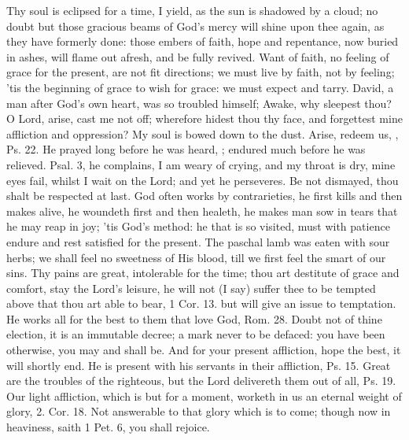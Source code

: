 {Thy soul is eclipsed for a time, I yield, as the sun is shadowed by a
cloud; no doubt but those gracious beams of God's mercy will shine upon
thee again, as they have formerly done: those embers of faith, hope and
repentance, now buried in ashes, will flame out afresh, and be fully
revived. Want of faith, no feeling of grace for the present, are not
fit directions; we must live by faith, not by feeling; 'tis the
beginning of grace to wish for grace: we must expect and tarry. David,
a man after God's own heart, was so troubled himself; Awake, why
sleepest thou? O Lord, arise, cast me not off; wherefore hidest thou
thy face, and forgettest mine affliction and oppression? My soul is
bowed down to the dust. Arise, redeem us, \etc{}, Ps.  22. He prayed
long before he was heard, ; endured much before he
was relieved. Psal.  3, he complains, I am weary of crying, and my
throat is dry, mine eyes fail, whilst I wait on the Lord; and yet he
perseveres. Be not dismayed, thou shalt be respected at last. God often
works by contrarieties, he first kills and then makes alive, he
woundeth first and then healeth, he makes man sow in tears that he may
reap in joy; 'tis God's method: he that is so visited, must with
patience endure and rest satisfied for the present. The paschal lamb
was eaten with sour herbs; we shall feel no sweetness of His blood,
till we first feel the smart of our sins. Thy pains are great,
intolerable for the time; thou art destitute of grace and comfort, stay
the Lord's leisure, he will not (I say) suffer thee to be tempted above
that thou art able to bear, 1 Cor.  13. but will give an issue to
temptation. He works all for the best to them that love God, Rom. 
28. Doubt not of thine election, it is an immutable decree; a mark
never to be defaced: you have been otherwise, you may and shall be. And
for your present affliction, hope the best, it will shortly end. He is
present with his servants in their affliction, Ps.  15. Great are
the troubles of the righteous, but the Lord delivereth them out of all,
Ps.  19. Our light affliction, which is but for a moment, worketh
in us an eternal weight of glory, 2. Cor.  18. Not answerable to
that glory which is to come; though now in heaviness, saith 1 Pet. 
6, you shall rejoice.

}

